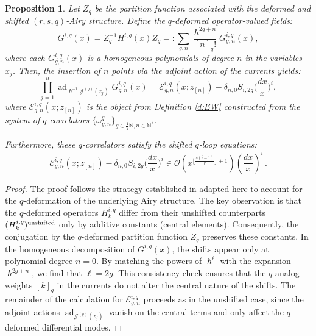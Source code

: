 \documentclass[reqno,11pt]{amsart}
\theoremstyle{plain}
\newtheorem{proposition}[theorem]{Proposition}
\theoremstyle{definition}
\theoremstyle{remark}
\numberwithin{equation}{section}
\newcommand{\1}{\mathds{1}}
\newcommand{\2}{\frac{1}{2}}
\DeclareMathOperator{\ad}{ad}
\begin{document}
{								\begin{proposition}\label{p:shifteloopeq}
									Let $Z_q$ be the partition function associated with the deformed and shifted $(r,s,q)$-Airy structure. Define the $q$-deformed operator-valued fields:
									\begin{equation}
										G^{i,q}(x) = Z_q^{-1} H^{i,q}(x) Z_q  =: \sum_{g,n} \frac{\hslash^{2g+n}}{[n]_q!} G^{i,q}_{g,n}(x),
									\end{equation}
									where each $G^{i,q}_{g,n}(x)$ is a homogeneous polynomials of degree $n$ in the variables $x_j$.
									Then, the insertion of $n$ points via the adjoint action of the currents yields:
									\begin{equation}
										\prod_{j=1}^n \ad_{\hslash^{-1}\mathcal{J}^{(q)}_-(z_j)} G^{i,q}_{g,n}(x) = \mathcal{E}^{i,q}_{g,n}(x; z_{[n]}) - \delta_{n,0} S_{i,2g} \Big( \frac{dx}{x}\Big)^i ,
									\end{equation}
									where $ \mathcal{E}^{i,q}_{g,n}(x; z_{[n]})$ is the object from Definition \ref{d:EW} constructed from the system of $q$-correlators $\{\omega^{q}_{g,n} \}_{g \in \frac{1}{2}\mathbb{N}, n \in \mathbb{N}^*}$.
									
									Furthermore, these $q$-correlators  satisfy the \emph{shifted $q$-loop equations}:
									\begin{equation}\label{eq:sle}
										\mathcal{E}^{i,q}_{g,n} (x; z_{[n]}) - \delta_{n,0} S_{i,2g} \Big( \frac{dx}{x}\Big)^i  \in \mathcal{O} \left( x^{ \lfloor \frac{s(i-1)}{r}\rfloor + 1} \right) \left( \frac{dx}{x}\right)^i \,.
									\end{equation}
								\end{proposition}
								
								\begin{proof}
									The proof follows the strategy established in \cite[Sections~4.3-4]{BKS23} adapted here to account for the $q$-deformation of the underlying Airy structure. The key observation is that the $q$-deformed operators $ H^{i,q}_k$  differ from their unshifted counterparts $ (H^{i,q}_k)^{\textup{unshifted}}$ only by additive constants (central elements).  Consequently, the conjugation by the $q$-deformed partition function $Z_q$ preserves these constants. In the homogeneous decomposition of $ G^{i,q}(x)$, the shifts appear only at polynomial degree $n=0$. By matching the powers of $ \hslash^{\ell}$ with the expansion $ \hslash^{2g+n}$, we find that $ \ell = 2g$. This consistency check ensures that the $q$-analog weights $[k]_q$ in the currents do not alter the central nature of the shifts. The remainder of the calculation for $ \mathcal{E}^{i,q}_{g,n}$ proceeds as in the unshifted case, since the adjoint actions $ \ad_{\mathcal{J}^{(q)}_-(z_j)}$  vanish on the central terms and only affect the $q$-deformed differential modes.
								\end{proof}
								
}
\end{document}
